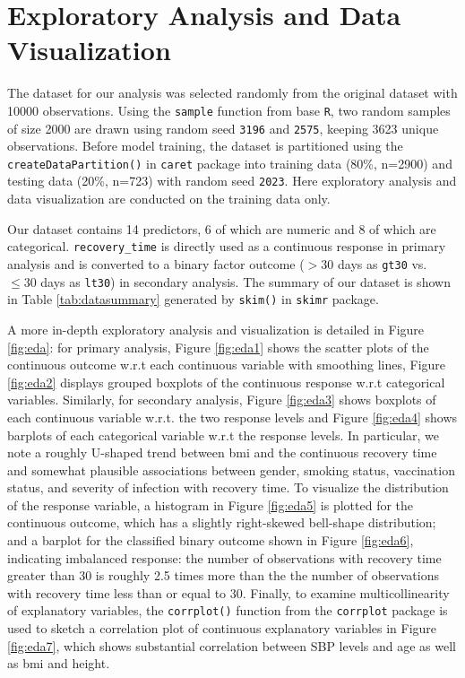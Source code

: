 \documentclass[11pt]{article}
\begin{document}
\section{Exploratory Analysis and Data Visualization}

The dataset for our analysis was selected randomly from the original dataset with 10000 observations. Using the \texttt{sample} function from base \texttt{R}, two random samples of size 2000 are drawn using random seed \texttt{3196} and \texttt{2575}, keeping 3623 unique observations. Before model training, the dataset is partitioned using the \texttt{createDataPartition()} in \texttt{caret} package into training data (80\%, n=2900) and testing data (20\%, n=723) with random seed \texttt{2023}. Here exploratory analysis and data visualization are conducted on the training data only.

Our dataset contains 14 predictors, 6 of which are numeric and 8 of which are categorical. \texttt{recovery\_time} is directly used as a continuous response in primary analysis and is converted to a binary factor outcome ($> 30$ days as \texttt{gt30} vs. $\le 30$ days as \texttt{lt30}) in secondary analysis. The summary of our dataset is shown in Table \ref{tab:datasummary} generated by \texttt{skim()} in \texttt{skimr} package.

A more in-depth exploratory analysis and visualization is detailed in Figure \ref{fig:eda}: for primary analysis, Figure \ref{fig:eda1} shows the scatter plots of the continuous outcome w.r.t each continuous variable with smoothing lines, Figure \ref{fig:eda2} displays grouped boxplots of the continuous response w.r.t categorical variables. Similarly, for secondary analysis, Figure \ref{fig:eda3} shows boxplots of each continuous variable w.r.t. the two response levels and Figure \ref{fig:eda4} shows barplots of each categorical variable w.r.t the response levels. In particular, we note a roughly U-shaped trend between bmi and the continuous recovery time and somewhat plausible associations between gender, smoking status, vaccination status, and severity of infection with recovery time. To visualize the distribution of the response variable, a histogram in Figure \ref{fig:eda5} is plotted for the continuous outcome, which has a slightly right-skewed bell-shape distribution; and a barplot for the classified binary outcome shown in Figure \ref{fig:eda6}, indicating imbalanced response: the number of observations with recovery time greater than 30 is roughly 2.5 times more than the the number of observations with recovery time less than or equal to 30. Finally, to examine multicollinearity of explanatory variables, the \texttt{corrplot()} function from the \texttt{corrplot} package is used to sketch a correlation plot of continuous explanatory variables in Figure \ref{fig:eda7}, which shows substantial correlation between SBP levels and age as well as bmi and height.
\end{document}
